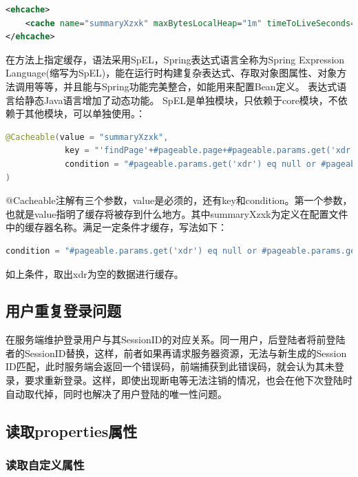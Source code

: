 \documentclass[letter]{book}
\begin{document}
\begin{lstlisting}[language=XML]
<ehcache>
	<cache name="summaryXzxk" maxBytesLocalHeap="1m" timeToLiveSeconds="200"/>
</ehcache>
\end{lstlisting}

在方法上指定缓存，语法采用SpEL，Spring表达式语言全称为Spring Expression Language(缩写为SpEL)，能在运行时构建复杂表达式、存取对象图属性、对象方法调用等等，并且能与Spring功能完美整合，如能用来配置Bean定义。 表达式语言给静态Java语言增加了动态功能。
SpEL是单独模块，只依赖于core模块，不依赖于其他模块，可以单独使用。：

\begin{lstlisting}[language=Java]
@Cacheable(value = "summaryXzxk",
			key = "'findPage'+#pageable.page+#pageable.params.get('xdr')",
			condition = "#pageable.params.get('xdr') eq null or #pageable.params.get('xdr') eq ''"
)
\end{lstlisting}

@Cacheable注解有三个参数，value是必须的，还有key和condition。第一个参数，也就是value指明了缓存将被存到什么地方。其中summaryXzxk为定义在配置文件中的缓存器名称。满足一定条件才缓存，写法如下：

\begin{lstlisting}[language=Java]
condition = "#pageable.params.get('xdr') eq null or #pageable.params.get('xdr') eq ''"
\end{lstlisting}

如上条件，取出xdr为空的数据进行缓存。

\subsection{用户重复登录问题}

在服务端维护登录用户与其SessionID的对应关系。同一用户，后登陆者将前登陆者的SessionID替换，这样，前者如果再请求服务器资源，无法与新生成的Session ID匹配，此时服务端会返回一个错误码，前端捕获到此错误码，就会认为其未登录，要求重新登录。这样，即使出现断电等无法注销的情况，也会在他下次登陆时自动取代掉，同时也解决了用户登陆的唯一性问题。

\subsection{读取properties属性}

\subsubsection{读取自定义属性}
\end{document}
